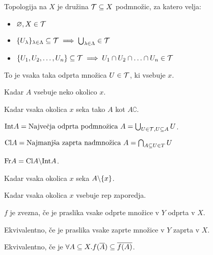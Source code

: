
Topologija na $X$ je družina $\mathcal{T} \subseteq X$ podmnožic, za katero velja:
\begin{itemize}
  \item $\varnothing, X \in \mathcal{T}$
  \item $\{U_\lambda\}_{\lambda \in \Lambda} \subseteq \mathcal{T}
	\implies \bigcup_{\lambda \in \Lambda} \in \mathcal{T}$
  \item $\{ {U}_1 , {U}_2 , \ldots , {U}_{n} \} \subseteq \mathcal{T}
	\implies {U}_1 \cap {U}_2 \cap \ldots \cap {U}_{n} \in \mathcal{T}$
\end{itemize}


To je vsaka taka odprta množica $U \in \mathcal{T}$, ki vsebuje $x$.


Kadar $A$ vsebuje neko okolico $x$.


Kadar vsaka okolica $x$ seka tako $A$ kot $A\complement$.


$\text{Int} A = \text{Največja odprta podmnožica $A$} =
\bigcup_{U \in \mathcal{T}, U \subseteq A} U$.

$\text{Cl} A = \text{Najmanjša zaprta nadmnožica $A$} =
\bigcap_{A \subseteq U \in T} U$

$\text{Fr} A = \text{Cl} A \backslash \text{Int} A$.


Kadar vsaka okolica $x$ seka $A \backslash \{x\}$.


Kadar vsaka okolica $x$ vsebuje rep zaporedja.


$f$ je zvezna, če je praslika vsake odprte množice v $Y$ odprta v $X$.

Ekvivalentno, če je praslika vsake zaprte množice v $Y$ zaprta v $X$.

Ekvivalentno, če je $\forall A \subseteq X . f(\overline{A}) \subseteq \overline{f(A)}$.


